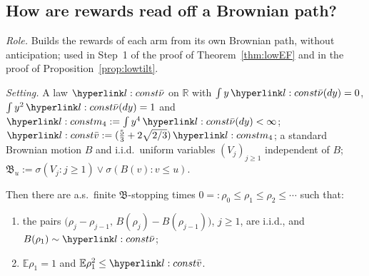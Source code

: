\documentclass[11pt]{article}
\newcommand{\R}{\mathbb{R}}
\newcommand{\E}{\mathbb{E}}
\newcommand{\1}{\mathbf{1}}
\begin{document}
\subsection{How are rewards read off a Brownian path?}\label{sec:app-low-skor}

\begin{lemma}\label{lem:skor}
\textit{Role.} Builds the rewards of each arm from its own Brownian path, without anticipation; used in Step~1 of the proof of Theorem~\ref{thm:lowEF} and in the
proof of Proposition~\ref{prop:lowtilt}.

\noindent\textit{Setting.} A law $\lnub$ on $\R$ with $\int y\,\lnub(dy)=0$, $\int y^2\,\lnub(dy)=1$ and $\lmq:=\int y^4\,\lnub(dy)<\infty$; $\lvb:=(\frac53+2\sqrt{2/3})\,\lmq$; a standard
Brownian motion $B$ and i.i.d.\ uniform variables $(V_j)_{j\ge1}$ independent of $B$; $\mathfrak B_u:=\sigma(V_j:j\ge1)\vee\sigma(B(v):v\le u)$.

\noindent Then there are a.s.\ finite $\mathfrak B$-stopping times $0=:\rho_0\le\rho_1\le\rho_2\le\cdots$ such that:
\begin{enumerate}
\item[(i)] the pairs $\big(\rho_j-\rho_{j-1},\,B(\rho_j)-B(\rho_{j-1})\big)$, $j\ge1$, are i.i.d., and $B(\rho_1)\sim\lnub$;
\item[(ii)] $\E\rho_1=1$ and $\E\rho_1^2\le\lvb$.
\end{enumerate}
\end{lemma}
\end{document}
